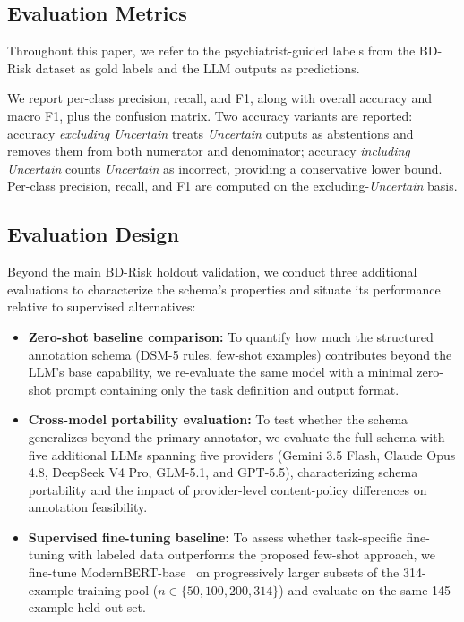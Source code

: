 \documentclass[runningheads]{llncs}
\begin{document}
\subsection{Evaluation Metrics}
\label{sec:metrics}

Throughout this paper, we refer to the psychiatrist-guided labels from the BD-Risk dataset as gold labels and the LLM outputs as predictions.

We report per-class precision, recall, and F1, along with overall accuracy and macro F1, plus the confusion matrix. Two accuracy variants are reported: accuracy \emph{excluding} \emph{Uncertain} treats \emph{Uncertain} outputs as abstentions and removes them from both numerator and denominator; accuracy \emph{including} \emph{Uncertain} counts \emph{Uncertain} as incorrect, providing a conservative lower bound. Per-class precision, recall, and F1 are computed on the excluding-\emph{Uncertain} basis.

\subsection{Evaluation Design}
\label{sec:evaldesign}

Beyond the main BD-Risk holdout validation, we conduct three additional evaluations to characterize the schema's properties and situate its performance relative to supervised alternatives:

\begin{itemize}
\item \textbf{Zero-shot baseline comparison:} To quantify how much the structured annotation schema (DSM-5 rules, few-shot examples) contributes beyond the LLM's base capability, we re-evaluate the same model with a minimal zero-shot prompt containing only the task definition and output format.
\item \textbf{Cross-model portability evaluation:} To test whether the schema generalizes beyond the primary annotator, we evaluate the full schema with five additional LLMs spanning five providers (Gemini 3.5 Flash, Claude Opus 4.8, DeepSeek V4 Pro, GLM-5.1, and GPT-5.5), characterizing schema portability and the impact of provider-level content-policy differences on annotation feasibility.
\item \textbf{Supervised fine-tuning baseline:} To assess whether task-specific fine-tuning with labeled data outperforms the proposed few-shot approach, we fine-tune ModernBERT-base~\cite{warner2025modernbert} on progressively larger subsets of the 314-example training pool ($n \in \{50, 100, 200, 314\}$) and evaluate on the same 145-example held-out set.
\end{itemize}
\end{document}
